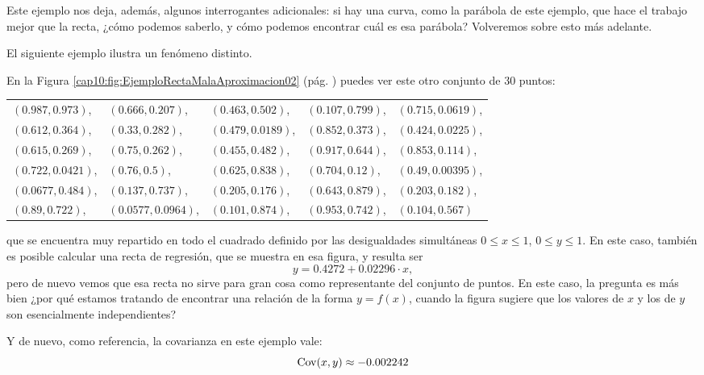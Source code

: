 Este ejemplo nos deja, además, algunos interrogantes adicionales: si hay una curva, como la parábola de este ejemplo, que hace el trabajo mejor que la recta, ¿cómo podemos saberlo, y cómo podemos encontrar cuál es esa parábola? Volveremos sobre esto más adelante.

El siguiente ejemplo ilustra un fenómeno distinto.
\begin{ejemplo}\label{cap10:ejem:RectaMalaAproximacion02}
En la Figura \ref{cap10:fig:EjemploRectaMalaAproximacion02} (pág. \pageref{cap10:fig:EjemploRectaMalaAproximacion02}) puedes ver este otro conjunto de $30$ puntos:\\
{\small
\begin{center}
\begin{tabular}{lllll}
$(0.987,0.973)$,&  $(0.666,0.207)$,&  $(0.463,0.502)$,&  $(0.107,0.799)$,&  $(0.715,0.0619)$, \\
$(0.612,0.364)$,&  $(0.33,0.282)$,&  $(0.479,0.0189)$,&  $(0.852,0.373)$,&  $(0.424,0.0225)$, \\
$(0.615,0.269)$,&  $(0.75,0.262)$,&  $(0.455,0.482)$,&  $(0.917,0.644)$,&  $(0.853,0.114)$, \\
$(0.722,0.0421)$,&  $(0.76,0.5)$,&  $(0.625,0.838)$,&  $(0.704,0.12)$,&  $(0.49,0.00395)$, \\
$(0.0677,0.484)$,&  $(0.137,0.737)$,&  $(0.205,0.176)$,&  $(0.643,0.879)$,&  $(0.203,0.182)$,\\
$(0.89,0.722)$,&  $(0.0577,0.0964)$,&  $(0.101,0.874)$,&  $(0.953,0.742)$,&  $(0.104,0.567)$
\end{tabular}
\end{center}
}
que se encuentra muy repartido en todo el cuadrado definido por las desigualdades simultáneas $0\leq x\leq 1$, $0\leq y\leq 1$. En este caso, también es posible calcular una recta de regresión, que se muestra en esa figura, y resulta ser
\[y=0.4272+0.02296\cdot x,\]
pero de nuevo vemos que esa recta no sirve para gran cosa como representante del conjunto de puntos. En este caso, la pregunta es más bien ¿por qué estamos tratando de encontrar una relación de la forma $y=f(x)$, cuando la figura sugiere que los valores de $x$ y los de $y$ son esencialmente independientes?

Y de nuevo, como referencia, la covarianza en este ejemplo vale:
\[\mathrm{Cov}(x,y)\approx -0.002242\]


\end{ejemplo}
